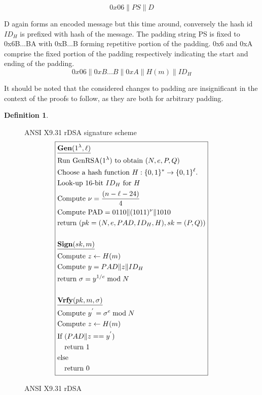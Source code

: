 \documentclass[]{final_report}
\theoremstyle{definition}
\newtheorem{definition}{Definition}[chapter]
\begin{document}
\[0x06\|PS\|D\]

D again forms an encoded message but this time around, conversely the hash id $ID_{H}$ is prefixed with hash of the message.  The padding string PS is fixed to 0x6B...BA with 0xB...B forming repetitive portion of the padding. 0x6 and 0xA comprise the fixed  portion of the padding respectively indicating the start and ending of the padding. 
\[0x06\|0xB . . . B\|0xA\|H(m)\|ID_{H}\]

It should be noted that the considered changes to padding are insignificant in the context of the proofs to follow, as they are both for arbitrary padding.


\begin{definition}
\begin{figure}[H]
\centering
\hfill ANSI X9.31 rDSA signature scheme\hfill\phantom{} 
\[
\boxed{
\begin{aligned}
&\underline{\textbf{\text{Gen}} (1^\lambda, \ell)} \\
&\text{Run GenRSA}(1^\lambda) \text{ to obtain } (N, e, P, Q) \\
&\text{Choose a hash function } H : \{0, 1\}^* \rightarrow \{0, 1\}^\ell. \\
&\text{Look-up } 16\text{-bit } ID_{H} \text{ for } H \\
&\text{Compute } \nu = \frac{(n - \ell - 24)}{4} \\
&\text{Compute PAD} = 0110 \| (1011)^{\nu} \| 1010 \\
&\text{return } (pk = (N, e, PAD, ID_{H}, H), sk = (P, Q)) \\
\\
&\underline{\textbf{\text{Sign}} (sk, m)} \\
&\text{Compute } z \leftarrow H(m) \\
&\text{Compute } y = PAD  \| z \| ID_{H} \\
&\text{return } \sigma = y^{1/e} \bmod N \\
\\
&\underline{\textbf{\text{Vrfy}} (pk, m, \sigma)} \\
&\text{Compute } y^{'} = \sigma^{e} \bmod N \\
&\text{Compute } z \leftarrow H(m) \\
&\text{If } (PAD \| z == y^{'}) \\
&\quad \text{return } 1 \\
&\text{else} \\
&\quad \text{return } 0 
\end{aligned}
}
\]
\caption{ANSI X9.31 rDSA}
\label{fig:ansix931}
\end{figure}
\end{definition}
\end{document}
